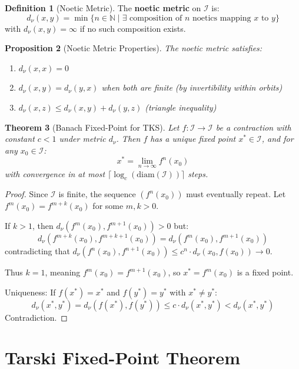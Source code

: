 \documentclass[11pt,twoside,openright]{book}
\theoremstyle{definition}
\newtheorem{definition}{Definition}[chapter]
\theoremstyle{plain}
\newtheorem{theorem}[definition]{Theorem}
\newtheorem{proposition}[definition]{Proposition}
\theoremstyle{remark}
\newcommand{\Ideas}{\mathcal{I}}
\begin{document}
\begin{definition}[Noetic Metric]
\label{def:noetic-metric}
The \textbf{noetic metric} on $\Ideas$ is:
\[
d_\nu(x, y) = \min\{n \in \mathbb{N} \mid \exists \text{ composition of } n \text{ noetics mapping } x \text{ to } y\}
\]
with $d_\nu(x, y) = \infty$ if no such composition exists.
\end{definition}

\begin{proposition}[Noetic Metric Properties]
\label{prop:noetic-metric-props}
The noetic metric satisfies:
\begin{enumerate}
  \item $d_\nu(x, x) = 0$
  \item $d_\nu(x, y) = d_\nu(y, x)$ when both are finite (by invertibility within orbits)
  \item $d_\nu(x, z) \leq d_\nu(x, y) + d_\nu(y, z)$ (triangle inequality)
\end{enumerate}
\end{proposition}

\begin{theorem}[Banach Fixed-Point for TKS]
\label{thm:banach-tks}
Let $f : \Ideas \to \Ideas$ be a contraction with constant $c < 1$ under metric $d_\nu$. Then $f$ has a unique fixed point $x^* \in \Ideas$, and for any $x_0 \in \Ideas$:
\[
x^* = \lim_{n \to \infty} f^n(x_0)
\]
with convergence in at most $\lceil \log_c(\mathrm{diam}(\Ideas)) \rceil$ steps.
\end{theorem}

\begin{proof}
Since $\Ideas$ is finite, the sequence $(f^n(x_0))$ must eventually repeat. Let $f^m(x_0) = f^{m+k}(x_0)$ for some $m, k > 0$.

If $k > 1$, then $d_\nu(f^m(x_0), f^{m+1}(x_0)) > 0$ but:
\[
d_\nu(f^{m+k}(x_0), f^{m+k+1}(x_0)) = d_\nu(f^m(x_0), f^{m+1}(x_0))
\]
contradicting that $d_\nu(f^n(x_0), f^{n+1}(x_0)) \leq c^n \cdot d_\nu(x_0, f(x_0)) \to 0$.

Thus $k = 1$, meaning $f^m(x_0) = f^{m+1}(x_0)$, so $x^* = f^m(x_0)$ is a fixed point.

Uniqueness: If $f(x^*) = x^*$ and $f(y^*) = y^*$ with $x^* \neq y^*$:
\[
d_\nu(x^*, y^*) = d_\nu(f(x^*), f(y^*)) \leq c \cdot d_\nu(x^*, y^*) < d_\nu(x^*, y^*)
\]
Contradiction.
\end{proof}

\section{Tarski Fixed-Point Theorem}
\end{document}

